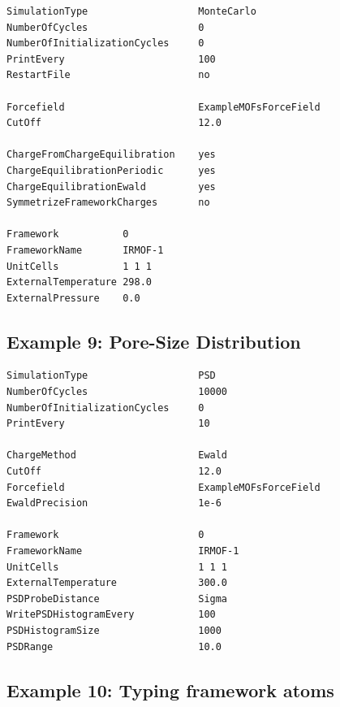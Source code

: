 \begin{tiny}
\begin{verbatim}
SimulationType                   MonteCarlo
NumberOfCycles                   0
NumberOfInitializationCycles     0
PrintEvery                       100
RestartFile                      no

Forcefield                       ExampleMOFsForceField
CutOff                           12.0

ChargeFromChargeEquilibration    yes
ChargeEquilibrationPeriodic      yes
ChargeEquilibrationEwald         yes
SymmetrizeFrameworkCharges       no

Framework           0
FrameworkName       IRMOF-1
UnitCells           1 1 1
ExternalTemperature 298.0
ExternalPressure    0.0
\end{verbatim}
\end{tiny}

\subsection*{Example 9: Pore-Size Distribution}

\begin{tiny}
\begin{verbatim}
SimulationType                   PSD
NumberOfCycles                   10000
NumberOfInitializationCycles     0
PrintEvery                       10

ChargeMethod                     Ewald
CutOff                           12.0
Forcefield                       ExampleMOFsForceField
EwaldPrecision                   1e-6

Framework                        0
FrameworkName                    IRMOF-1
UnitCells                        1 1 1
ExternalTemperature              300.0
PSDProbeDistance                 Sigma
WritePSDHistogramEvery           100
PSDHistogramSize                 1000
PSDRange                         10.0
\end{verbatim}
\end{tiny}

\subsection*{Example 10: Typing framework atoms}

